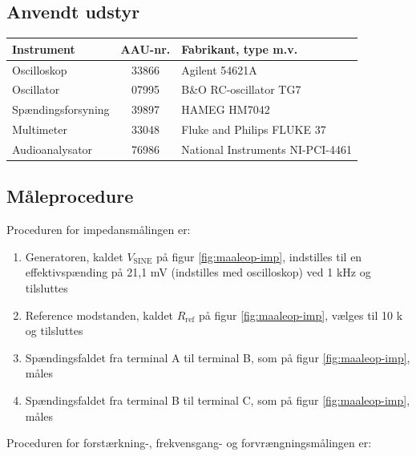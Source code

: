 \subsection*{Anvendt udstyr}

\begin{table}[h]
\centering
\begin{tabular}{l|c|l}
\hline\hline
Instrument & AAU-nr. & Fabrikant, type m.v. \\
\hline\hline
Oscilloskop & 33866 & Agilent 54621A \\[4pt]
Oscillator & 07995 & B\&O RC-oscillator TG7 \\[4pt]
Spændingsforsyning & 39897 & HAMEG HM7042 \\[4pt]
Multimeter & 33048 & Fluke and Philips FLUKE 37 \\[4pt]
Audioanalysator & 76986 & National Instruments NI-PCI-4461 \\
\hline\hline
\end{tabular}
\label{tab:maaleudstyr_forforstaerker}
\end{table}

\subsection*{Måleprocedure}
Proceduren for impedansmålingen er:

\begin{enumerate}
\item Generatoren, kaldet $V_\mathrm{SINE}$ på figur \ref{fig:maaleop-imp}, indstilles til en effektivspænding på 21,1 mV (indstilles med oscilloskop) ved 1 kHz og tilsluttes
\item Reference modstanden, kaldet $R_\mathrm{ref}$ på figur \ref{fig:maaleop-imp}, vælges til 10 k\ohm~ og tilsluttes
\item Spændingsfaldet fra terminal A til terminal B, som på figur \ref{fig:maaleop-imp}, måles
\item Spændingsfaldet fra terminal B til terminal C, som på figur \ref{fig:maaleop-imp}, måles
\end{enumerate}

Proceduren for forstærkning-, frekvensgang- og forvrængningsmålingen er:

